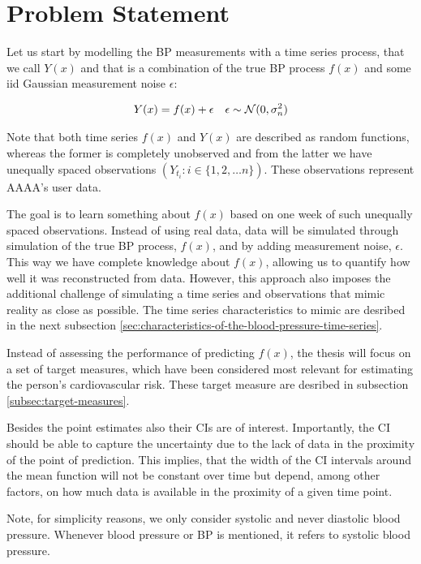 \section{Problem Statement}

Let us start by modelling the BP measurements with a time series process, that we call
$Y(x)$ and that is a combination of the true BP process $f(x)$ and some iid
Gaussian measurement noise $\epsilon$:

\begin{align*}
    Y(x) = f(x) + \epsilon && \epsilon \sim \operatorname{\mathcal{N}}(0, \sigma_n^{2})
\end{align*}

Note that both time series $f(x)$ and $Y(x)$ are described as random functions,
whereas the former is completely unobserved and from the latter we have
unequally spaced observations $(Y_{t_i}: i \in \{1, 2, \dots n\})$.
These observations represent AAAA's user data.

The goal is to learn something about $f(x)$ based on one week of such unequally
spaced observations.
Instead of using real data, data will be simulated through simulation of the
true BP process, $f(x)$, and by adding measurement noise, $\epsilon$.
This way we have complete knowledge about $f(x)$, allowing us to quantify
how well it was reconstructed from data.
However, this approach also imposes the additional challenge
of simulating a time series and observations that mimic reality as close
as possible.
The time series characteristics to mimic are desribed in the next subsection
\ref{sec:characteristics-of-the-blood-pressure-time-series}.

Instead of assessing the performance of predicting $f(x)$,
the thesis will focus on a set of target measures,
which have been considered most relevant for estimating the person’s cardiovascular risk.
These target measure are desribed in subsection \ref{subsec:target-measures}.

Besides the point estimates also their CIs are of interest.
Importantly, the CI should be able to capture the uncertainty due to the lack
of data in the proximity of the point of prediction.
This implies, that the width of the CI intervals around the mean function will
not be constant over time but depend, among
other factors, on how much data is available in the proximity of a given time point.

Note, for simplicity reasons, we only consider systolic and never diastolic
blood pressure.
Whenever blood pressure or BP is mentioned, it refers to systolic blood pressure.


